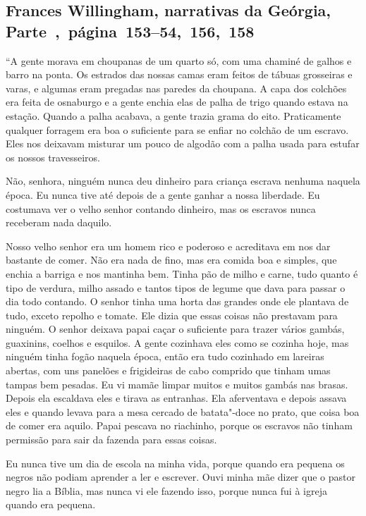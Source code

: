 \subsection{Frances Willingham, narrativas da Geórgia, Parte~,~página~153--54,~156,~158}
\label{ref296}

``A gente morava em choupanas de um quarto só, com uma chaminé de galhos
e barro na ponta. Os estrados das nossas camas eram feitos de tábuas
grosseiras e varas, e algumas eram pregadas nas paredes da choupana. A
capa dos colchões era feita de osnaburgo e a gente enchia elas de palha
de trigo quando estava na estação. Quando a palha acabava, a gente
trazia grama do eito. Praticamente qualquer forragem era boa o
suficiente para se enfiar no colchão de um escravo. Eles nos deixavam
misturar um pouco de algodão com a palha usada para estufar os nossos
travesseiros.

Não, senhora, ninguém nunca deu dinheiro para criança escrava
nenhuma naquela época. Eu nunca tive até depois de a gente ganhar a
nossa liberdade. Eu costumava ver o velho senhor contando dinheiro, mas
os escravos nunca receberam nada daquilo.

Nosso velho senhor era um homem rico e poderoso e acreditava em nos dar
bastante de comer. Não era nada de fino, mas era comida boa e simples,
que enchia a barriga e nos mantinha bem. Tinha pão de milho e carne,
tudo quanto é tipo de verdura, milho assado e tantos tipos de legume que
dava para passar o dia todo contando. O senhor tinha uma horta das
grandes onde ele plantava de tudo, exceto repolho e tomate. Ele dizia
que essas coisas não prestavam para ninguém. O senhor deixava papai
caçar o suficiente para trazer vários gambás, guaxinins, coelhos e
esquilos. A gente cozinhava eles como se cozinha hoje, mas ninguém tinha
fogão naquela época, então era tudo cozinhado em lareiras abertas, com
uns panelões e frigideiras de cabo comprido que tinham umas tampas bem
pesadas. Eu vi mamãe limpar muitos e muitos gambás nas brasas. Depois
ela escaldava eles e tirava as entranhas. Ela aferventava e depois
assava eles e quando levava para a mesa cercado de batata"-doce no prato,
que coisa boa de comer era aquilo. Papai pescava no riachinho, porque os
escravos não tinham permissão para sair da fazenda para essas coisas.

Eu nunca tive um dia de escola na minha vida, porque quando era
pequena os negros não podiam aprender a ler e escrever. Ouvi minha mãe
dizer que o pastor negro lia a Bíblia, mas nunca vi ele fazendo isso,
porque nunca fui à igreja quando era pequena.

